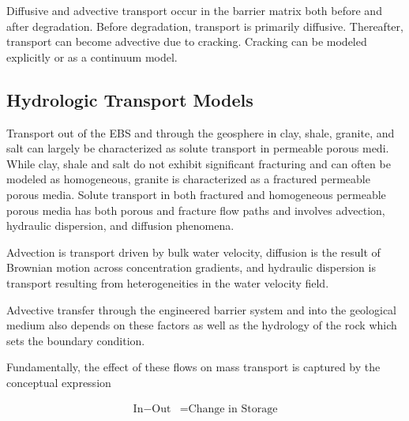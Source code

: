 Diffusive and advective transport occur in the barrier matrix both before and 
after degradation. Before degradation, transport is primarily diffusive. 
Thereafter, transport can become advective due to cracking. Cracking can be 
modeled explicitly or as a continuum model.  



\subsection{Hydrologic Transport Models}

Transport out of the \gls{EBS} and through the geosphere in clay, shale, granite,
and salt can largely be characterized as solute transport in permeable porous 
medi. While clay, shale and salt do not exhibit significant fracturing and can 
often be modeled as homogeneous, granite is  characterized as a fractured 
permeable porous media.  Solute transport in both fractured and homogeneous 
permeable porous media has both porous and fracture flow paths and involves
advection, hydraulic dispersion, and diffusion phenomena. 

Advection is transport driven by bulk water velocity, diffusion is the 
result of Brownian motion across concentration gradients, and hydraulic 
dispersion is transport resulting from heterogeneities in the water velocity field. 

Advective transfer through the engineered barrier system and into the geological medium 
also depends on these factors as well as the hydrology of the rock which sets 
the boundary condition.


Fundamentally, the effect of these flows on mass transport is captured by the 
conceptual expression 

\begin{align}
  \mbox{In} - \mbox{Out} &= \mbox{Change in Storage}
  \label{inout}
\end{align} 







